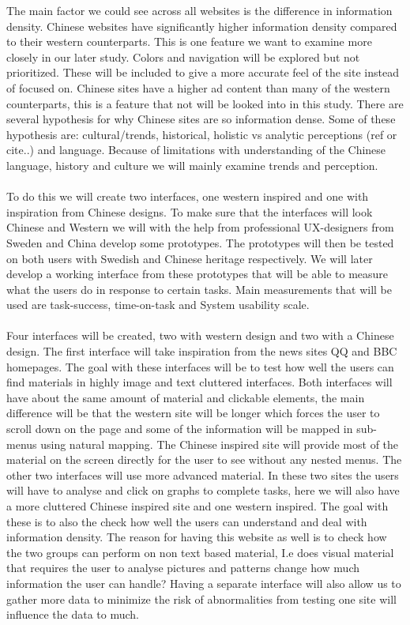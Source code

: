  The main factor we could see across all websites is the difference in information density. Chinese websites have significantly higher information density compared to their western counterparts. This is one feature we want to examine more closely in our later study. Colors and navigation will be explored but not prioritized. These will be included to give a more accurate feel of the site instead of focused on. Chinese sites have a higher ad content than many of the western counterparts, this is a feature that not will be looked into in this study.   There are several hypothesis for why Chinese sites are so information dense. Some of these hypothesis are: cultural/trends, historical, holistic vs analytic perceptions (ref or cite..) and language. Because of limitations with understanding of the Chinese language, history and culture we will mainly examine trends and perception.
 \\\\
  To do this we will create two interfaces, one western inspired and one with inspiration from Chinese designs. To make sure that the interfaces will look Chinese and Western we will with the help from professional UX-designers from Sweden and China develop some prototypes. The prototypes will then be tested on both users with Swedish and Chinese heritage respectively. We will later develop a working interface from these prototypes that will be able to measure what the users do in response to certain tasks. Main measurements that will be used are task-success, time-on-task and System usability scale. \cite{brooke1996sus} 
  \\\\
  Four interfaces will be created, two with western design and two with a Chinese design. The first interface will take inspiration from the news sites QQ and BBC homepages. The goal with these interfaces will be to test how well the users can find materials in highly image and text cluttered interfaces. Both interfaces will have about the same amount of material and clickable elements, the main difference will be that the western site will be longer which forces the user to scroll down on the page and some of the information will be mapped in sub-menus using natural mapping. \cite{Norman} The Chinese inspired site will provide most of the material on the screen directly for the user to see without any nested menus.  The other two interfaces will use more advanced material. In these two sites the users will have to analyse and click on graphs to complete tasks, here we will also have a more cluttered Chinese inspired site and one western inspired. The goal with these is to also the check how well the users can understand and deal with information density. The reason for having this website as well is to check how the two groups can perform on non text based material, I.e does visual material that requires the user to analyse pictures and patterns change how much information the user can handle? Having a separate interface will also allow us to gather more data to minimize the risk of abnormalities from testing one site will influence the data to much.
   
